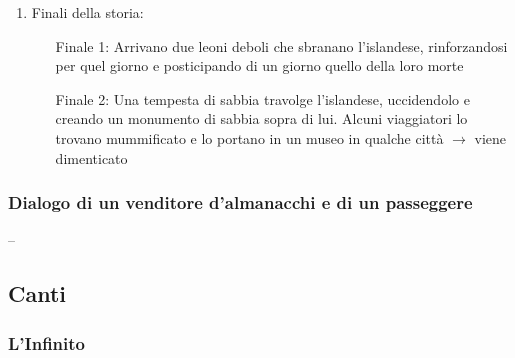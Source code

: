 \documentclass{article}
\begin{document}
\begin{enumerate}
    \item Finali della storia:
        \begin{itemize}
            \item[Finale 1:] Arrivano due leoni deboli che sbranano l'islandese, rinforzandosi
                per quel giorno e posticipando di un giorno quello della loro morte
            \item[Finale 2:] Una tempesta di sabbia travolge l'islandese, uccidendolo e creando
                un monumento di sabbia sopra di lui. Alcuni viaggiatori lo trovano mummificato
                e lo portano in un museo in qualche città $\rightarrow$ viene dimenticato
        \end{itemize}
\end{enumerate}

\newpage
\subsubsection{Dialogo di un venditore d'almanacchi e di un passeggere}

--

\newpage
\subsection{Canti}
\subsubsection{L'Infinito}
\end{document}
